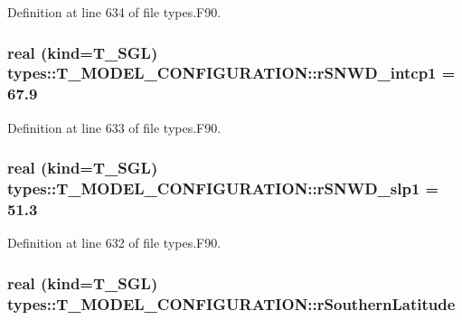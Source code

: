 Definition at line 634 of file types.F90.

\hypertarget{typetypes_1_1_t___m_o_d_e_l___c_o_n_f_i_g_u_r_a_t_i_o_n_a161b512f5dbd8520728de20c53e00d6c}{
\subsubsection[{rSNWD\_\-intcp1}]{\setlength{\rightskip}{0pt plus 5cm}real (kind={\bf T\_\-SGL}) {\bf types::T\_\-MODEL\_\-CONFIGURATION::rSNWD\_\-intcp1} = 67.9}}
\label{typetypes_1_1_t___m_o_d_e_l___c_o_n_f_i_g_u_r_a_t_i_o_n_a161b512f5dbd8520728de20c53e00d6c}


Definition at line 633 of file types.F90.

\hypertarget{typetypes_1_1_t___m_o_d_e_l___c_o_n_f_i_g_u_r_a_t_i_o_n_a7b7f6e5e817b0404fea20ae828fea7e6}{
\subsubsection[{rSNWD\_\-slp1}]{\setlength{\rightskip}{0pt plus 5cm}real (kind={\bf T\_\-SGL}) {\bf types::T\_\-MODEL\_\-CONFIGURATION::rSNWD\_\-slp1} = 51.3}}
\label{typetypes_1_1_t___m_o_d_e_l___c_o_n_f_i_g_u_r_a_t_i_o_n_a7b7f6e5e817b0404fea20ae828fea7e6}


Definition at line 632 of file types.F90.

\hypertarget{typetypes_1_1_t___m_o_d_e_l___c_o_n_f_i_g_u_r_a_t_i_o_n_a9a5b7950f0586c3b1cd97d7fd34a8adb}{
\subsubsection[{rSouthernLatitude}]{\setlength{\rightskip}{0pt plus 5cm}real (kind={\bf T\_\-SGL}) {\bf types::T\_\-MODEL\_\-CONFIGURATION::rSouthernLatitude}}}
\label{typetypes_1_1_t___m_o_d_e_l___c_o_n_f_i_g_u_r_a_t_i_o_n_a9a5b7950f0586c3b1cd97d7fd34a8adb}


